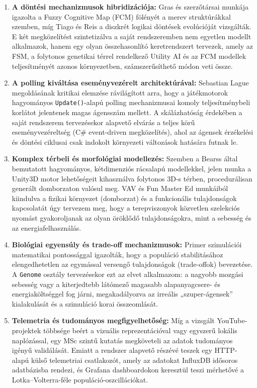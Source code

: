 \begin{enumerate}
    \item \textbf{A döntési mechanizmusok hibridizációja:} Gras és szerzőtársai \cite{Gras09} munkája igazolta a Fuzzy Cognitive Map (FCM) fölényét a merev struktúrákkal szemben, míg Tiago és Reis \cite{Tiago08} a diszkrét logikai döntések evolúcióját vizsgálták. E két megközelítést szintetizálva a saját rendszeremben nem egyetlen modellt alkalmazok, hanem egy olyan összehasonlító keretrendszert tervezek, amely az FSM, a folytonos genetikai térrel rendelkező Utility AI és az FCM modellek teljesítményét azonos környezetben, számszerűsíthető módon veti össze.
    
    \item \textbf{A polling kiváltása eseményvezérelt architektúrával:} Sebastian Lague \cite{Sebastian19} megoldásának kritikai elemzése rávilágított arra, hogy a játékmotorok hagyományos \texttt{Update()}-alapú polling mechanizmusai komoly teljesítménybeli korlátot jelentenek magas ágensszám mellett. A skálázhatóság érdekében a saját rendszerem tervezésekor alapvető elvárás a teljes körű eseményvezéreltség (C\# event-driven megközelítés), ahol az ágensek érzékelési és döntési ciklusai csak indokolt környezeti változások hatására futnak le.
    
    \item \textbf{Komplex térbeli és morfológiai modellezés:} Szemben a Bearss \cite{Michael22} által bemutatott hagyományos, kétdimenziós rácsalapú modellekkel, jelen munka a Unity3D motor lehetőségeit kihasználva folytonos 3D-s térben, procedurálisan generált domborzaton valósul meg. VAV \cite{VAV23} és Fun Master Ed \cite{Fun22} munkáiból kiindulva a fizikai környezet (domborzat) és a funkcionális tulajdonságok kapcsolatát úgy tervezem meg, hogy a terepviszonyok közvetlen szelekciós nyomást gyakoroljanak az olyan öröklődő tulajdonságokra, mint a sebesség és az energiafelhasználás.
    
    \item \textbf{Biológiai egyensúly és trade-off mechanizmusok:} Primer \cite{Primer18} szimulációi matematikai pontossággal igazolták, hogy a populáció stabilitásához elengedhetetlen az egymással versengő tulajdonságok (trade-offok) bevezetése. A \texttt{Genome} osztály tervezésekor ezt az elvet alkalmazom: a nagyobb mozgási sebesség vagy a kiterjedtebb látómező magasabb alapanyagcsere- és energiaköltséggel fog járni, megakadályozva az irreális „szuper-ágensek” kialakulását és a szimuláció korai összeomlását.
    
    \item \textbf{Telemetria és tudományos megfigyelhetőség:} Míg a vizsgált YouTube-projektek többsége \cite{Sebastian19, VAV23, Fun20} beért a vizuális reprezentációval vagy egyszerű lokális naplózással, egy MSc szintű kutatás megköveteli az adatok tudományos igényű validálását. Emiatt a rendszer alapvető részévé teszek egy HTTP-alapú külső telemetriai csatlakozót, amely az adatokat InfluxDB idősoros adatbázisba rendezi, és Grafana dashboardokon keresztül teszi mérhetővé a Lotka–Volterra-féle populáció-oszcillációkat.
\end{enumerate}